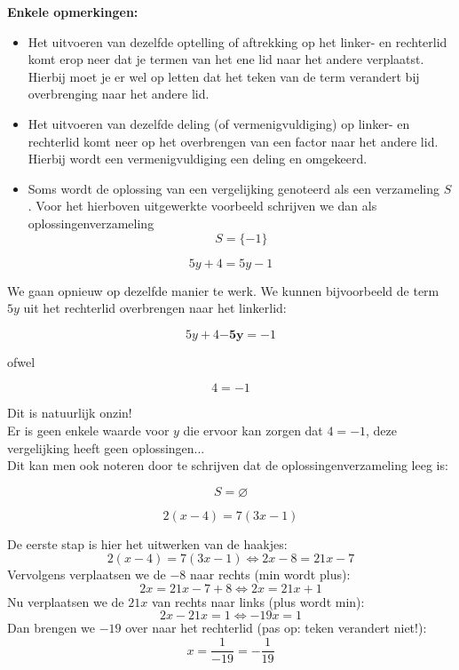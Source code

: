 {\bf Enkele opmerkingen:}

\begin{itemize} \item Het uitvoeren van dezelfde optelling of aftrekking op het linker- en rechterlid komt erop neer  dat je termen van het ene lid naar het andere verplaatst. Hierbij moet je er wel op letten dat het teken van de term verandert bij overbrenging naar het andere lid. \item Het uitvoeren van dezelfde deling (of vermenigvuldiging) op linker- en rechterlid komt neer op het overbrengen van een factor naar het andere lid. Hierbij wordt een vermenigvuldiging een deling en omgekeerd. \item {Soms wordt de oplossing van een vergelijking genoteerd als een verzameling $S$. Voor het hierboven uitgewerkte voorbeeld schrijven we dan als oplossingenverzameling
 \[ S=\{-1\} \] }
\end{itemize}

\begin{voorbeeld}

\[ 5y+4=5y-1  \]

We gaan opnieuw op dezelfde manier te werk. We kunnen bijvoorbeeld de term $5y$ uit het rechterlid overbrengen naar het linkerlid:

\[ 5y+4 \boldsymbol{-5y} = -1 \]

ofwel

\[ 4 = -1 \]

Dit is natuurlijk onzin!\\
Er is geen enkele waarde voor $y$ die ervoor kan zorgen dat $4=-1$, deze vergelijking heeft geen oplossingen...\\
Dit kan men ook noteren door te schrijven dat de oplossingenverzameling leeg is:

\[ S=\varnothing \]

\end{voorbeeld}

\begin{voorbeeld}

\[2(x-4)=7(3x-1)\]

De eerste stap is hier het uitwerken van de haakjes:
\[2(x-4)=7(3x-1) \Leftrightarrow 2x-8=21x-7\]
Vervolgens verplaatsen we de $-8$ naar rechts (min wordt plus):
\[2x=21x-7+8\Leftrightarrow 2x=21x+1\]
Nu verplaatsen we de $21x$ van rechts naar links (plus wordt min):
\[2x-21x=1\Leftrightarrow -19x=1\]
Dan brengen we $-19$ over naar het rechterlid (pas op: teken verandert niet!):
\[x=\frac{1}{-19}=-\frac{1}{19}\]

\end{voorbeeld}

